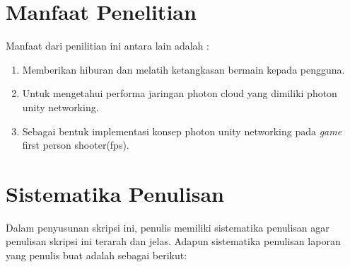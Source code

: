 \section{Manfaat Penelitian}
Manfaat dari penilitian ini antara lain adalah : 
\begin{enumerate}
	\item Memberikan hiburan dan melatih ketangkasan bermain 
	kepada pengguna.
	\item Untuk mengetahui performa jaringan photon cloud yang dimiliki photon unity networking.
	\item Sebagai bentuk implementasi konsep photon unity networking pada \textit{\textit{game}} first person shooter(fps).
\end{enumerate}

\section{Sistematika Penulisan}
\noindent

Dalam penyusunan skripsi ini, penulis memiliki sistematika penulisan agar 
penulisan skripsi ini terarah dan jelas. Adapun sistematika penulisan laporan yang 
penulis buat adalah sebagai berikut:

